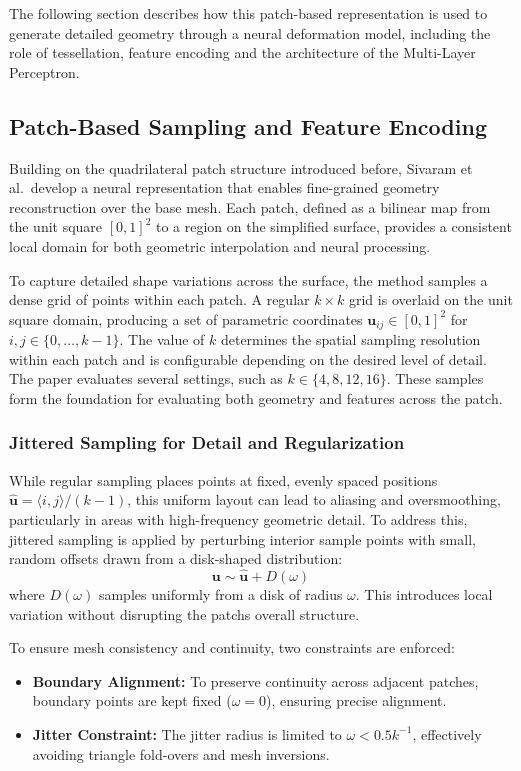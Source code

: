 The following section describes how this patch-based representation is used to generate detailed geometry through a neural deformation model, including the role of tessellation, feature encoding and the architecture of the Multi-Layer Perceptron.  

\subsection{Patch-Based Sampling and Feature Encoding}

Building on the quadrilateral patch structure introduced before, Sivaram et al.\ develop a neural representation that enables fine-grained geometry reconstruction over the base mesh.  
Each patch, defined as a bilinear map from the unit square $[0,1]^2$ to a region on the simplified surface, provides a consistent local domain for both geometric interpolation and neural processing.  

To capture detailed shape variations across the surface, the method samples a dense grid of points within each patch.  
A regular $k \times k$ grid is overlaid on the unit square domain, producing a set of parametric coordinates $\mathbf{u}_{ij} \in [0,1]^2$ for $i,j \in \{0, \ldots, k - 1\}$.  
The value of $k$ determines the spatial sampling resolution within each patch and is configurable depending on the desired level of detail.  
The paper evaluates several settings, such as $k \in \{4, 8, 12, 16\}$.  
These samples form the foundation for evaluating both geometry and features across the patch.

\subsubsection{Jittered Sampling for Detail and Regularization}

While regular sampling places points at fixed, evenly spaced positions $\hat{\mathbf{u}} = \langle i, j \rangle / (k - 1)$, this uniform layout can lead to aliasing and oversmoothing, particularly in areas with high-frequency geometric detail.  
To address this, jittered sampling is applied by perturbing interior sample points with small, random offsets drawn from a disk-shaped distribution:  
\[
\mathbf{u} \sim \hat{\mathbf{u}} + D(\omega)
\]  
where $D(\omega)$ samples uniformly from a disk of radius $\omega$.  
This introduces local variation without disrupting the patchs overall structure.  

To ensure mesh consistency and continuity, two constraints are enforced:  
\begin{itemize}
  \item \textbf{Boundary Alignment:} To preserve continuity across adjacent patches, boundary points are kept fixed ($\omega = 0$), ensuring precise alignment.  
  \item \textbf{Jitter Constraint:} The jitter radius is limited to $\omega < 0.5k^{-1}$, effectively avoiding triangle fold-overs and mesh inversions.  
\end{itemize}


